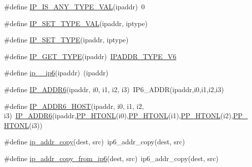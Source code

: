 \begin{DoxyCompactItemize}
\#define \hyperlink{openmote-cc2538_2lwip_2src_2include_2lwip_2ip__addr_8h_a83b17dbf7d1faf5c8f8c20b039db8bb8}{I\+P\+\_\+\+I\+S\+\_\+\+A\+N\+Y\+\_\+\+T\+Y\+P\+E\+\_\+\+V\+AL}(ipaddr)~0
\item 
\#define \hyperlink{openmote-cc2538_2lwip_2src_2include_2lwip_2ip__addr_8h_aaa800ce1929a1bb0f3d64bebd44e4051}{I\+P\+\_\+\+S\+E\+T\+\_\+\+T\+Y\+P\+E\+\_\+\+V\+AL}(ipaddr,  iptype)
\item 
\#define \hyperlink{openmote-cc2538_2lwip_2src_2include_2lwip_2ip__addr_8h_a4d435d88b2eaebaea1ef75ee586204fd}{I\+P\+\_\+\+S\+E\+T\+\_\+\+T\+Y\+PE}(ipaddr,  iptype)
\item 
\#define \hyperlink{openmote-cc2538_2lwip_2src_2include_2lwip_2ip__addr_8h_aa2d07afd28376f89da2cdcf5d2497ce7}{I\+P\+\_\+\+G\+E\+T\+\_\+\+T\+Y\+PE}(ipaddr)~\hyperlink{group__ipaddr_ggaf2142f0dfdcc938e2db16aa745ed585caae510fd8ec7fe405b594b57af61f9a02}{I\+P\+A\+D\+D\+R\+\_\+\+T\+Y\+P\+E\+\_\+\+V6}
\item 
\#define \hyperlink{openmote-cc2538_2lwip_2src_2include_2lwip_2ip__addr_8h_a06e75bcd198012b5ba39480c233608bd}{ip\+\_\+\_\+ip6}(ipaddr)~(ipaddr)
\item 
\#define \hyperlink{openmote-cc2538_2lwip_2src_2include_2lwip_2ip__addr_8h_a9ee53b601b89dcb517496ba0bccf9bd0}{I\+P\+\_\+\+A\+D\+D\+R6}(ipaddr,  i0,  i1,  i2,  i3)~I\+P6\+\_\+\+A\+D\+DR(ipaddr,i0,i1,i2,i3)
\item 
\#define \hyperlink{openmote-cc2538_2lwip_2src_2include_2lwip_2ip__addr_8h_abfb1ce44d6a8791336bf3ac06aa086ca}{I\+P\+\_\+\+A\+D\+D\+R6\+\_\+\+H\+O\+ST}(ipaddr,  i0,  i1,  i2,  i3)~\hyperlink{openmote-cc2538_2lwip_2src_2include_2lwip_2ip__addr_8h_a9ee53b601b89dcb517496ba0bccf9bd0}{I\+P\+\_\+\+A\+D\+D\+R6}(ipaddr,\hyperlink{openmote-cc2538_2lwip_2src_2include_2lwip_2def_8h_afea9c21aa1f56180cdf6fb42ef14a294}{P\+P\+\_\+\+H\+T\+O\+NL}(i0),\hyperlink{openmote-cc2538_2lwip_2src_2include_2lwip_2def_8h_afea9c21aa1f56180cdf6fb42ef14a294}{P\+P\+\_\+\+H\+T\+O\+NL}(i1),\hyperlink{openmote-cc2538_2lwip_2src_2include_2lwip_2def_8h_afea9c21aa1f56180cdf6fb42ef14a294}{P\+P\+\_\+\+H\+T\+O\+NL}(i2),\hyperlink{openmote-cc2538_2lwip_2src_2include_2lwip_2def_8h_afea9c21aa1f56180cdf6fb42ef14a294}{P\+P\+\_\+\+H\+T\+O\+NL}(i3))
\item 
\#define \hyperlink{openmote-cc2538_2lwip_2src_2include_2lwip_2ip__addr_8h_a77a933975db287f6aa5c2e70249ba18f}{ip\+\_\+addr\+\_\+copy}(dest,  src)~ip6\+\_\+addr\+\_\+copy(dest, src)
\item 
\#define \hyperlink{openmote-cc2538_2lwip_2src_2include_2lwip_2ip__addr_8h_abe6f7908ce8a91dc587e2ebc2172e651}{ip\+\_\+addr\+\_\+copy\+\_\+from\+\_\+ip6}(dest,  src)~ip6\+\_\+addr\+\_\+copy(dest, src)

\end{DoxyCompactItemize}
